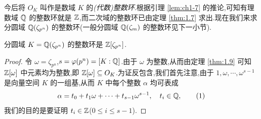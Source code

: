 今后将 $O_K$ 叫作是数域 $K$ 的\emph{(代数)整数环}.根据引理 \ref{lem:ch1-7} 的推论,可知有理数域 $\mathbb{Q}$ 的整数环就是 $\mathbb{Z}$,而二次域的整数环已由定理 \ref{thm:1.7} 求出.现在我们来求分圆域 $\mathbb{Q}(\zeta_{p^n})$ 的整数环(一般分圆域 $\mathbb{Q}(\zeta_m)$ 的整数环见下一小节).

\begin{theorem}\label{thm:1.10}
分圆域 $K=\mathbb{Q}(\zeta_{p^n})$ 的整数环是 $\mathbb{Z}[\zeta_{p^n}]$.
\end{theorem}

\begin{proof}
令 $\omega=\zeta_{p^n}$,$s=\varphi(p^n)=[K:\mathbb{Q}]$.由于 $\omega$ 为整数,从而由定理 \ref{thm:1.9} 可知 $\mathbb{Z}[\omega]$ 中元素均为整数,即 $\mathbb{Z}[\omega]\subseteq O_K$.为证反包含,我们首先注意,由于 $1,\omega,\cdots,\omega^{s-1}$ 是向量空间 $K$ 的一组基,从而 $K$ 中每个整数 $\alpha$ 均可表成
\begin{equation}  \alpha=t_0+t_1\omega+\cdots+t_{s-1}\omega^{s-1},\quad t_i\in\mathbb{Q},\tag{1}\end{equation}
我们的目的是要证明 $t_i\in\mathbb{Z}$($0\leqslant i\leqslant s-1$).


\end{proof}
